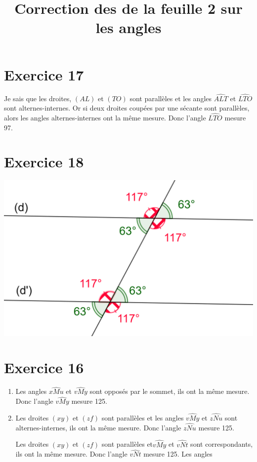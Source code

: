 \documentclass[12pt,a4paper]{article}
\title{Correction des de la feuille 2 sur les angles}
\date{}
\begin{document}
	
\maketitle

\vspace*{-1cm}

\section*{Exercice 17}

Je sais que les droites, $(AL)$ et $(TO)$ sont parallèles et les angles $\widehat{ALT}$ et $\widehat{LTO}$ sont alternes-internes.
Or si deux droites coupées par une sécante sont parallèles, alors les angles alternes-internes ont la même mesure.
Donc l'angle $\widehat{LTO}$ mesure 97\degree .


\section*{Exercice 18}

\begin{center}
	\includegraphics[scale=0.15]{ex18}
\end{center}


\section*{Exercice 16}

\begin{enumerate}[label=\alph*.]
	\item Les angles $\widehat{xMu}$ et $\widehat{vMy}$ sont opposés par le sommet, ils ont la même mesure. Donc l'angle $\widehat{vMy}$ mesure 125\degree .
	
	
	\item Les droites $(xy)$ et $(zf)$ sont parallèles et les angles $\widehat{vMy}$ et $\widehat{zNu}$ sont alternes-internes, ils ont la même mesure. Donc l'angle  $\widehat{zNu}$ mesure 125\degree .
	
	Les droites $(xy)$ et $(zf)$ sont parallèles et$\widehat{vMy}$ et $\widehat{vNt}$ sont correspondants, ils ont la même mesure. Donc l'angle  $\widehat{vNt}$ mesure 125\degree .
	Les angles 
\end{enumerate}
\end{document}
